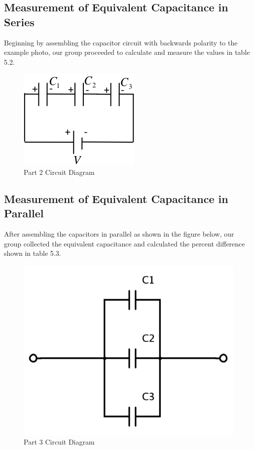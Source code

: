 \documentclass[titlepage]{article}
\begin{document}
        \subsection{Measurement of Equivalent Capacitance in Series}
        Beginning by assembling the capacitor circuit with backwards polarity to the example photo, our group proceeded to calculate and measure the values in table 5.2.\\ 

        \begin{figure}[hbt!] 
            \centering
            \caption*{Part 2 Circuit Diagram}
            \includegraphics{images/procedure/part2.png}
        \end{figure} 

        \subsection{Measurement of Equivalent Capacitance in Parallel}
        After assembling the capacitors in parallel as shown in the figure below, our group collected the equivalent capacitance and calculated the percent difference shown in table 5.3.

        \begin{figure}[hbt!] 
            \centering
            \caption*{Part 3 Circuit Diagram}
            \includegraphics[scale=0.5]{images/procedure/part3.png}
        \end{figure} 
\end{document}
